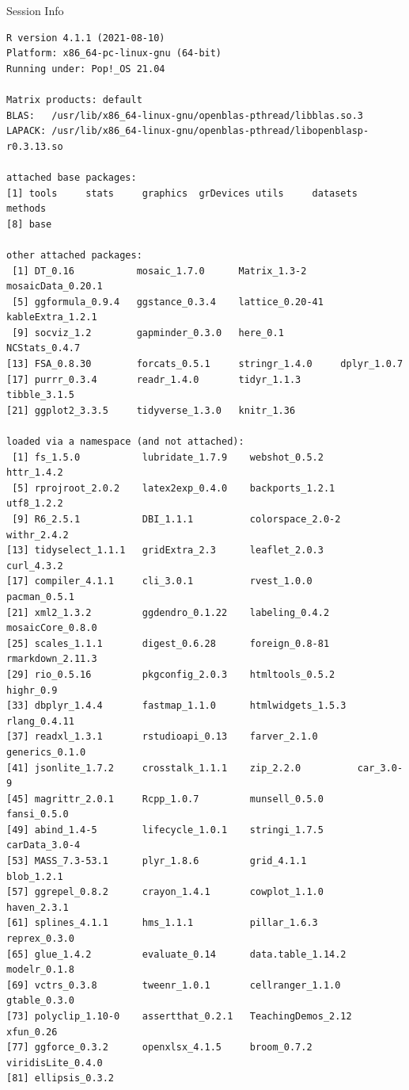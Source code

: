 \documentclass[10pt]{beamer}\usepackage[]{graphicx}\usepackage[]{color}
\makeatletter
\newenvironment{kframe}{%
 \def\at@end@of@kframe{}%
 \ifinner\ifhmode%
  \def\at@end@of@kframe{\end{minipage}}%
  \begin{minipage}{\columnwidth}%
 \fi\fi%
 \def\FrameCommand##1{\hskip\@totalleftmargin \hskip-\fboxsep
 \colorbox{shadecolor}{##1}\hskip-\fboxsep
     \hskip-\linewidth \hskip-\@totalleftmargin \hskip\columnwidth}%
 \MakeFramed {\advance\hsize-\width
   \@totalleftmargin\z@ \linewidth\hsize
   \@setminipage}}%
 {\par\unskip\endMakeFramed%
 \at@end@of@kframe}
\newenvironment{knitrout}{}{} %
\makeatother
\begin{document}
\begin{frame}[fragile]{Session Info}
	\tiny
	
\begin{knitrout}\tiny
{}\color{fgcolor}\begin{kframe}
\begin{verbatim}
R version 4.1.1 (2021-08-10)
Platform: x86_64-pc-linux-gnu (64-bit)
Running under: Pop!_OS 21.04

Matrix products: default
BLAS:   /usr/lib/x86_64-linux-gnu/openblas-pthread/libblas.so.3
LAPACK: /usr/lib/x86_64-linux-gnu/openblas-pthread/libopenblasp-r0.3.13.so

attached base packages:
[1] tools     stats     graphics  grDevices utils     datasets  methods  
[8] base     

other attached packages:
 [1] DT_0.16           mosaic_1.7.0      Matrix_1.3-2      mosaicData_0.20.1
 [5] ggformula_0.9.4   ggstance_0.3.4    lattice_0.20-41   kableExtra_1.2.1 
 [9] socviz_1.2        gapminder_0.3.0   here_0.1          NCStats_0.4.7    
[13] FSA_0.8.30        forcats_0.5.1     stringr_1.4.0     dplyr_1.0.7      
[17] purrr_0.3.4       readr_1.4.0       tidyr_1.1.3       tibble_3.1.5     
[21] ggplot2_3.3.5     tidyverse_1.3.0   knitr_1.36       

loaded via a namespace (and not attached):
 [1] fs_1.5.0           lubridate_1.7.9    webshot_0.5.2      httr_1.4.2        
 [5] rprojroot_2.0.2    latex2exp_0.4.0    backports_1.2.1    utf8_1.2.2        
 [9] R6_2.5.1           DBI_1.1.1          colorspace_2.0-2   withr_2.4.2       
[13] tidyselect_1.1.1   gridExtra_2.3      leaflet_2.0.3      curl_4.3.2        
[17] compiler_4.1.1     cli_3.0.1          rvest_1.0.0        pacman_0.5.1      
[21] xml2_1.3.2         ggdendro_0.1.22    labeling_0.4.2     mosaicCore_0.8.0  
[25] scales_1.1.1       digest_0.6.28      foreign_0.8-81     rmarkdown_2.11.3  
[29] rio_0.5.16         pkgconfig_2.0.3    htmltools_0.5.2    highr_0.9         
[33] dbplyr_1.4.4       fastmap_1.1.0      htmlwidgets_1.5.3  rlang_0.4.11      
[37] readxl_1.3.1       rstudioapi_0.13    farver_2.1.0       generics_0.1.0    
[41] jsonlite_1.7.2     crosstalk_1.1.1    zip_2.2.0          car_3.0-9         
[45] magrittr_2.0.1     Rcpp_1.0.7         munsell_0.5.0      fansi_0.5.0       
[49] abind_1.4-5        lifecycle_1.0.1    stringi_1.7.5      carData_3.0-4     
[53] MASS_7.3-53.1      plyr_1.8.6         grid_4.1.1         blob_1.2.1        
[57] ggrepel_0.8.2      crayon_1.4.1       cowplot_1.1.0      haven_2.3.1       
[61] splines_4.1.1      hms_1.1.1          pillar_1.6.3       reprex_0.3.0      
[65] glue_1.4.2         evaluate_0.14      data.table_1.14.2  modelr_0.1.8      
[69] vctrs_0.3.8        tweenr_1.0.1       cellranger_1.1.0   gtable_0.3.0      
[73] polyclip_1.10-0    assertthat_0.2.1   TeachingDemos_2.12 xfun_0.26         
[77] ggforce_0.3.2      openxlsx_4.1.5     broom_0.7.2        viridisLite_0.4.0 
[81] ellipsis_0.3.2    
\end{verbatim}
\end{kframe}
\end{knitrout}
	
\end{frame}
\end{document}
